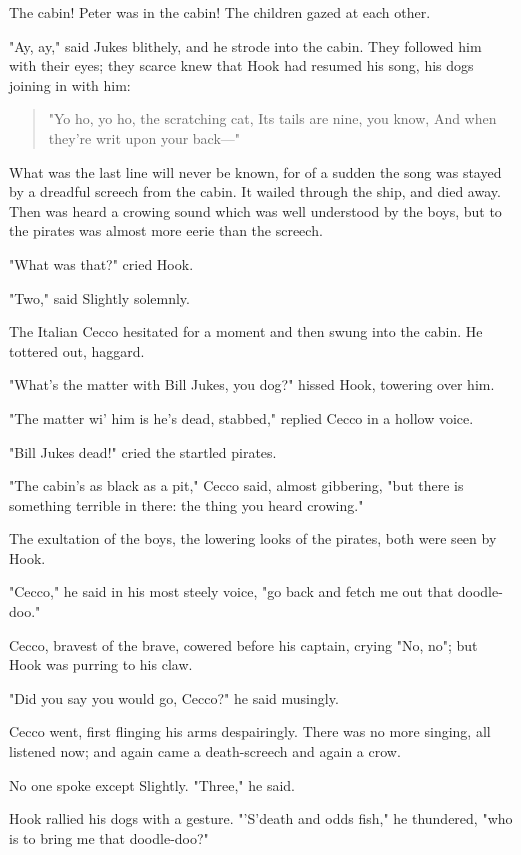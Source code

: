 The cabin! Peter was in the cabin! The children gazed at each other.


"Ay, ay," said Jukes blithely, and he strode into the cabin. They followed
him with their eyes; they scarce knew that Hook had resumed his song, his
dogs joining in with him:

\begin{verse}
"Yo ho, yo ho, the scratching cat,
Its tails are nine, you know,
And when they're writ upon your back—"
\end{verse}

What was the last line will never be known, for of a sudden the song was
stayed by a dreadful screech from the cabin. It wailed through the ship,
and died away. Then was heard a crowing sound which was well understood by
the boys, but to the pirates was almost more eerie than the screech.


"What was that?" cried Hook.


"Two," said Slightly solemnly.


The Italian Cecco hesitated for a moment and then swung into the cabin. He
tottered out, haggard.


"What's the matter with Bill Jukes, you dog?" hissed Hook, towering over
him.


"The matter wi' him is he's dead, stabbed," replied Cecco in a hollow
voice.


"Bill Jukes dead!" cried the startled pirates.


"The cabin's as black as a pit," Cecco said, almost gibbering, "but there
is something terrible in there: the thing you heard crowing."


The exultation of the boys, the lowering looks of the pirates, both were
seen by Hook.


"Cecco," he said in his most steely voice, "go back and fetch me out that
doodle-doo."


Cecco, bravest of the brave, cowered before his captain, crying "No, no";
but Hook was purring to his claw.


"Did you say you would go, Cecco?" he said musingly.


Cecco went, first flinging his arms despairingly. There was no more
singing, all listened now; and again came a death-screech and again a
crow.


No one spoke except Slightly. "Three," he said.


Hook rallied his dogs with a gesture. "'S'death and odds fish," he
thundered, "who is to bring me that doodle-doo?"



